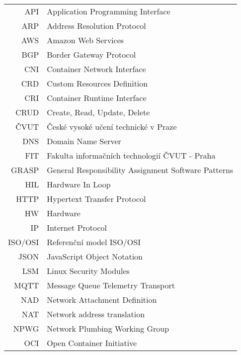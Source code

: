 


\begin{tabular}{rl}
API & Application Programming Interface\\
ARP & Address Resolution Protocol\\
AWS & Amazon Web Services\\
BGP & Border Gateway Protocol\\
CNI & Container Network Interface\\
CRD & Custom Resources Definition\\
CRI & Container Runtime Interface\\
CRUD & Create, Read, Update, Delete\\
ČVUT & České vysoké učení technické v Praze\\
DNS & Domain Name Server\\
FIT & Fakulta informačních technologií ČVUT - Praha\\
GRASP & General Responsibility Assignment Software Patterns\\
HIL & Hardware In Loop\\
HTTP & Hypertext Transfer Protocol\\
HW & Hardware\\
IP & Internet Protocol\\
ISO/OSI & Referenční model ISO/OSI\\
JSON & JavaScript Object Notation \\
LSM & Linux Security Modules\\
MQTT & Message Queue Telemetry Transport\\
NAD & Network Attachment Definition\\
NAT & Network address translation\\
NPWG & Network Plumbing Working Group\\
OCI & Open Container Initiative\\

\end{tabular}
